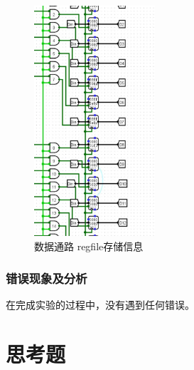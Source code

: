\documentclass{article}
\begin{document}
    \begin{figure}[H]
        \centering
        \includegraphics[width=0.4\textwidth]{7.5.3.png}
        \caption{数据通路 regfile存储信息}
    \end{figure}

    \subsubsection{错误现象及分析}
    在完成实验的过程中，没有遇到任何错误。

    \section{思考题}
\end{document}
